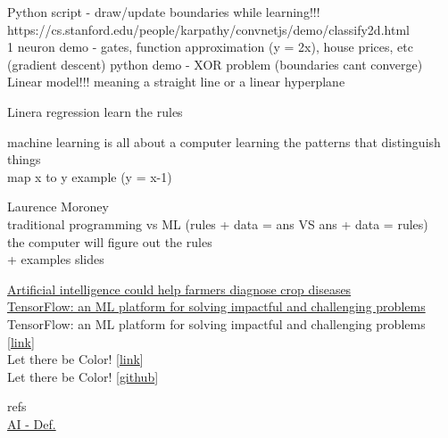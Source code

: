 \documentclass[10pt, compress]{beamer}
\begin{document}
\begin{frame}
  Python script - draw/update boundaries while learning!!! \\
  https://cs.stanford.edu/people/karpathy/convnetjs/demo/classify2d.html \\
  1 neuron demo - gates, function approximation (y = 2x), house prices, etc \\
(gradient descent)
python demo - XOR problem (boundaries cant converge) \\
Linear model!!! meaning a straight line or a linear hyperplane

Linera regression learn the rules \\

\end{frame}

\begin{frame}
machine learning is all about a computer learning the patterns that distinguish things \\
map x to y example (y = x-1)
\end{frame}

\begin{frame}
  Laurence Moroney \\
traditional programming vs ML (rules + data = ans VS ans + data = rules) \\
the computer will figure out the rules \\
+ examples slides
\end{frame}

\begin{frame}
\href{https://news.psu.edu/story/429727/2016/10/04/research/artificial-intelligence-could-help-farmers-diagnose-crop-diseases}{Artificial intelligence could help farmers diagnose crop diseases} \\
%
\href{https://www.youtube.com/watch?v=NlpS-DhayQA}{TensorFlow: an ML platform for solving impactful and challenging problems} \\

TensorFlow: an ML platform for solving impactful and challenging problems [\href{https://www.youtube.com/watch?v=NlpS-DhayQA}{link}] \\

Let there be Color! [\href{http://iizuka.cs.tsukuba.ac.jp/projects/colorization/extra.html}{link}] \\

Let there be Color! [\href{https://github.com/satoshiiizuka/siggraph2016_colorization}{github}]

refs \\
\href{https://www.sciencedaily.com/terms/artificial_intelligence.htm}{AI - Def.}


\end{frame}
\end{document}
